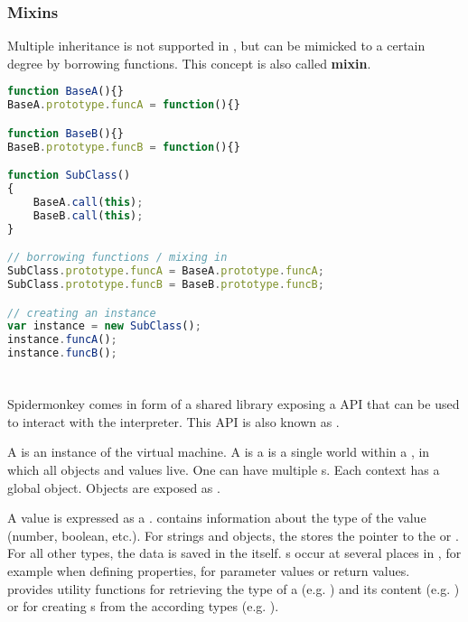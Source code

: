 
\subsubsection{Mixins}

Multiple inheritance is not supported in , but can be mimicked to a certain degree by borrowing functions. This concept is also called \textbf{mixin}.

\SingleSpacing
\begin{lstlisting}[language=JavaScript, caption=Mixins in \myProperName{JavaScript}, label=JSMixins]
function BaseA(){}
BaseA.prototype.funcA = function(){}

function BaseB(){}
BaseB.prototype.funcB = function(){}

function SubClass()
{
	BaseA.call(this);
	BaseB.call(this);
}

// borrowing functions / mixing in
SubClass.prototype.funcA = BaseA.prototype.funcA;
SubClass.prototype.funcB = BaseB.prototype.funcB;

// creating an instance
var instance = new SubClass();
instance.funcA();
instance.funcB();
\end{lstlisting}
\OnehalfSpacing

\section{}

Spidermonkey comes in form of a shared library exposing a  API that can be used to interact with the  interpreter. This API is also known as . 

A  is an instance of the virtual machine. A  is a is a single world within a , in which all objects and values live. One  can have multiple s. Each context has a global object. Objects are exposed as .

A  value is expressed as a .  contains information about the type of the value (number, boolean, etc.). For strings and objects, the  stores the pointer to the  or . For all other types, the data is saved in the  itself. s occur at several places in , for example when defining properties, for parameter values or return values.\\
 provides utility functions for retrieving the type of a  \linebreak(e.g. ) and its content (e.g. ) or for creating s from the according  types (e.g. ).

